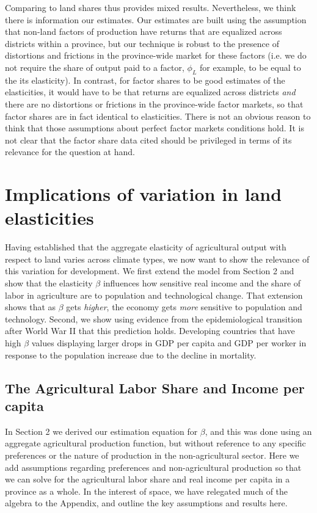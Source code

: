 \documentclass[11pt]{article}
\begin{document}
Comparing to land shares thus provides mixed results. Nevertheless, we think there is information our estimates. Our estimates are built using the assumption that non-land factors of production have returns that are equalized across districts within a province, but our technique is robust to the presence of distortions and frictions in the province-wide market for these factors (i.e. we do not require the share of output paid to a factor, $\phi_L$ for example, to be equal to the its elasticity). In contrast, for factor shares to be good estimates of the elasticities, it would have to be that returns are equalized across districts \textit{and} there are no distortions or frictions in the province-wide factor markets, so that factor shares are in fact identical to elasticities. There is not an obvious reason to think that those assumptions about perfect factor markets conditions hold. It is not clear that the factor share data cited should be privileged in terms of its relevance for the question at hand.

\section{Implications of variation in land elasticities}\label{SEC_implications}
Having established that the aggregate elasticity of agricultural output with respect to land varies across climate types, we now want to show the relevance of this variation for development. We first extend the model from Section 2 and show that the elasticity $\beta$ influences how sensitive real income and the share of labor in agriculture are to population and technological change. That extension shows that as $\beta$ gets \textit{higher}, the economy gets \textit{more} sensitive to population and technology. Second, we show using evidence from the epidemiological transition after World War II that this prediction holds. Developing countries that have high $\beta$ values displaying larger drops in GDP per capita and GDP per worker in response to the population increase due to the decline in mortality.

\subsection{The Agricultural Labor Share and Income per capita}
In Section 2 we derived our estimation equation for $\beta$, and this was done using an aggregate agricultural production function, but without reference to any specific preferences or the nature of production in the non-agricultural sector. Here we add assumptions regarding preferences and non-agricultural production so that we can solve for the agricultural labor share and real income per capita in a province as a whole. In the interest of space, we have relegated much of the algebra to the Appendix, and outline the key assumptions and results here. 
\end{document}
